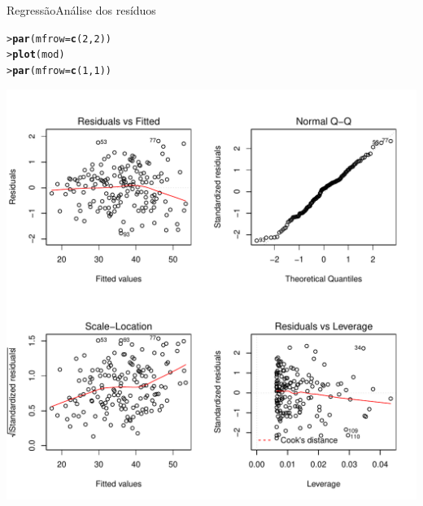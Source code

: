 \documentclass[10pt]{beamer}\usepackage[]{graphicx}\usepackage[]{color}
\makeatletter
\newcommand{\hlnum}[1]{\textcolor[rgb]{0.686,0.059,0.569}{#1}}%
\newcommand{\hlstd}[1]{\textcolor[rgb]{0.345,0.345,0.345}{#1}}%
\newcommand{\hlkwc}[1]{\textcolor[rgb]{0.333,0.667,0.333}{#1}}%
\newcommand{\hlkwd}[1]{\textcolor[rgb]{0.282,0.239,0.545}{\textbf{#1}}}%
\newenvironment{kframe}{%
 \def\at@end@of@kframe{}%
 \ifinner\ifhmode%
  \def\at@end@of@kframe{\end{minipage}}%
  \begin{minipage}{\columnwidth}%
 \fi\fi%
 \def\FrameCommand##1{\hskip\@totalleftmargin \hskip-\fboxsep
 \colorbox{shadecolor}{##1}\hskip-\fboxsep
     \hskip-\linewidth \hskip-\@totalleftmargin \hskip\columnwidth}%
 \MakeFramed {\advance\hsize-\width
   \@totalleftmargin\z@ \linewidth\hsize
   \@setminipage}}%
 {\par\unskip\endMakeFramed%
 \at@end@of@kframe}
\newenvironment{knitrout}{}{} %
\makeatother
\begin{document}
\begin{frame}[fragile=singleslide]{Regressão}{Análise dos resíduos}
\begin{knitrout}\small
{}\color{fgcolor}\begin{kframe}
\begin{alltt}
\hlstd{> }\hlkwd{par}\hlstd{(}\hlkwc{mfrow} \hlstd{=} \hlkwd{c}\hlstd{(}\hlnum{2}\hlstd{,}\hlnum{2}\hlstd{))}
\hlstd{> }\hlkwd{plot}\hlstd{(mod)}
\hlstd{> }\hlkwd{par}\hlstd{(}\hlkwc{mfrow} \hlstd{=} \hlkwd{c}\hlstd{(}\hlnum{1}\hlstd{,}\hlnum{1}\hlstd{))}
\end{alltt}
\end{kframe}

{\centering \includegraphics[width=.6\textwidth]{figure/unnamed-chunk-18} 

}



\end{knitrout}

\end{frame}
\end{document}
